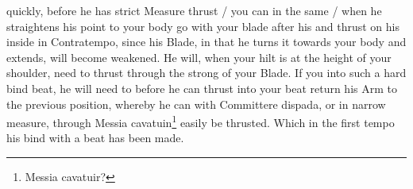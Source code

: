 \newpage


\newpage

quickly, before he has strict Measure thrust / you can in the same /
when he straightens his point to your body go with your blade after
his and thrust on his inside in Contratempo, since his Blade, in that
he turns it towards your body and extends, will become weakened. He
will, when your hilt is at the height of your shoulder, need to thrust
through the strong of your Blade. If you into such a hard bind beat,
he will need to before he can thrust into your beat return his Arm to
the previous position, whereby he can with Committere dispada, or in
narrow measure, through Messia cavatuin\footnote{Messia cavatuir?}
easily be thrusted. Which in the first tempo his bind with a beat has
been made.


